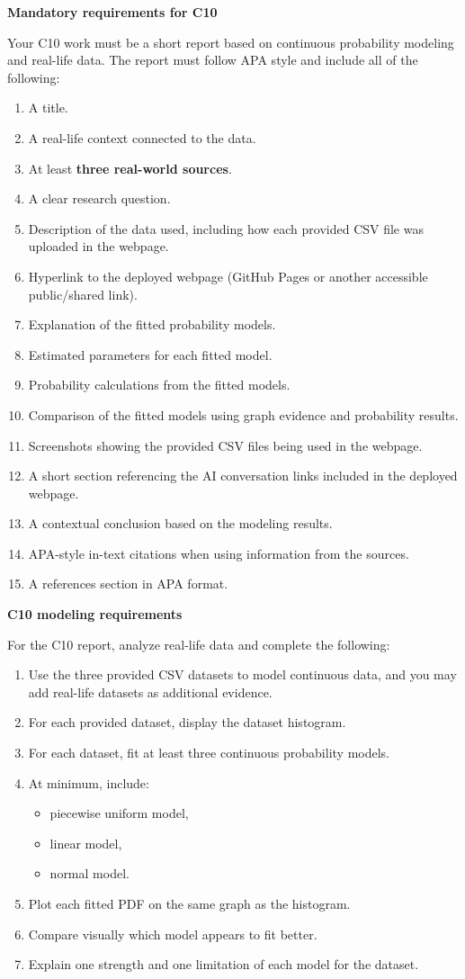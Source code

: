 \documentclass[12pt]{article}
\newcommand{\SubsectionBox}[1]{%
	\noindent\colorbox{gray!30}{%
		\parbox{\linewidth}{\textbf{#1}}%
	}\par\vspace{0.35cm}%
}
\begin{document}
	\SubsectionBox{Mandatory requirements for C10}
	Your C10 work must be a short report based on continuous probability modeling and real-life data. The report must follow APA style and include all of the following:
	\begin{enumerate}
		\item A title.
		\item A real-life context connected to the data.
		\item At least \textbf{three real-world sources}.
		\item A clear research question.
		\item Description of the data used, including how each provided CSV file was uploaded in the webpage.
		\item Hyperlink to the deployed webpage (GitHub Pages or another accessible public/shared link).
		\item Explanation of the fitted probability models.
		\item Estimated parameters for each fitted model.
		\item Probability calculations from the fitted models.
		\item Comparison of the fitted models using graph evidence and probability results.
		\item Screenshots showing the provided CSV files being used in the webpage.
		\item A short section referencing the AI conversation links included in the deployed webpage.
		\item A contextual conclusion based on the modeling results.
		\item APA-style in-text citations when using information from the sources.
		\item A references section in APA format.
	\end{enumerate}
	
	\SubsectionBox{C10 modeling requirements}
	For the C10 report, analyze real-life data and complete the following:
	\begin{enumerate}
		\item Use the three provided CSV datasets to model continuous data, and you may add real-life datasets as additional evidence.
		\item For each provided dataset, display the dataset histogram.
		\item For each dataset, fit at least three continuous probability models.
		\item At minimum, include:
		\begin{itemize}
			\item piecewise uniform model,
			\item linear model,
			\item normal model.
		\end{itemize}
		\item Plot each fitted PDF on the same graph as the histogram.
		\item Compare visually which model appears to fit better.
		\item Explain one strength and one limitation of each model for the dataset.
	\end{enumerate}
	
\end{document}
